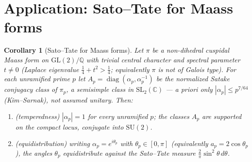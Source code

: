 \documentclass[11pt]{article}
\newtheorem{corollary}[theorem]{Corollary}
\theoremstyle{definition}
\begin{document}
\section{Application: Sato--Tate for Maass forms}\label{sec:cps-satotate}
\begin{corollary}[Sato--Tate for Maass forms]\label{cor:satotate}
Let $\pi$ be a non-dihedral cuspidal Maass form on $\mathrm{GL}(2)/\mathbb Q$ with trivial central
character and spectral parameter $t\neq0$ (Laplace eigenvalue $\tfrac14+t^2>\tfrac14$; equivalently $\pi$ is not
of Galois type). For each unramified prime $p$ let
$A_p=\operatorname{diag}(\alpha_p,\alpha_p^{-1})$ be the normalized Satake conjugacy class of $\pi_p$, a
semisimple class in $\mathrm{SL}_2(\mathbb C)$ --- a priori only $|\alpha_p|\le p^{7/64}$ (Kim--Sarnak),
\emph{not} assumed unitary. Then:
\begin{enumerate}
\item[\textup{(i)}] \emph{(temperedness)} $|\alpha_p|=1$ for every unramified $p$; the classes $A_p$ are
supported on the compact locus, conjugate into $\mathrm{SU}(2)$.
\item[\textup{(ii)}] \emph{(equidistribution)} writing $\alpha_p=e^{i\theta_p}$ with $\theta_p\in[0,\pi]$
(equivalently $a_p=2\cos\theta_p$), the angles $\theta_p$ equidistribute against the Sato--Tate measure
$\tfrac2\pi\sin^2\theta\,d\theta$.
\end{enumerate}
\end{corollary}
\end{document}

